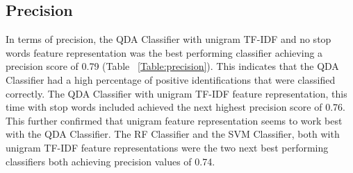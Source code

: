 \subsection{Precision}

In terms of precision, the QDA Classifier with unigram TF-IDF and no stop words feature representation was the best performing classifier achieving a precision score of 0.79 (Table ~\ref{Table:precision}). This indicates that the QDA Classifier had a high percentage of positive identifications that were classified correctly. The QDA Classifier with unigram TF-IDF feature representation, this time with stop words included achieved the next highest precision score of 0.76. This further confirmed that unigram feature representation seems to work best with the QDA Classifier. The RF Classifier and the SVM Classifier, both with unigram TF-IDF feature representations were the two next best performing classifiers both achieving precision values of 0.74.

